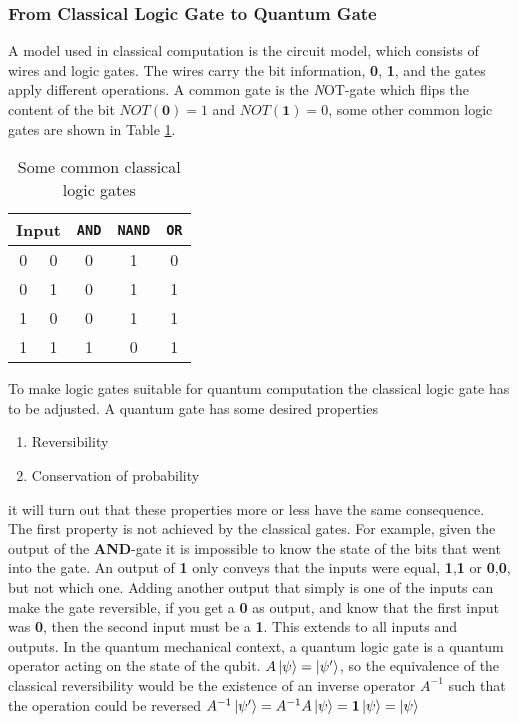 \subsubsection{From Classical Logic Gate to Quantum Gate}
A model used in classical computation is the circuit model, which consists of wires and logic gates. The wires carry the bit information, \textbf{0}, \textbf{1}, and the gates apply different operations. A common gate is the {\textit NOT}-gate which flips the content of the bit $NOT(\textbf{0}) = 1$ and $NOT(\textbf{1}) = 0$, some other common logic gates are shown in Table \ref{tab:gates}. 

\begin{table}[h]
    \centering
    \begin{tabular}{|c|c|c|c|c|}
    \hline
    \multicolumn{2}{|c|}{Input} & {\tt AND} & {\tt NAND} & {\tt OR}\\
    \hline
    0 & 0 & 0& 1& 0\\
    0 & 1 & 0& 1& 1\\
    1 & 0 & 0& 1& 1\\
    1 & 1 & 1& 0& 1\\
    \hline
    \end{tabular}
    \caption{Some common classical logic gates}
    \label{tab:gates}
\end{table}


To make logic gates suitable for quantum computation the classical logic gate has to be adjusted. A quantum gate has some desired properties
\begin{enumerate}
\item Reversibility 
\item Conservation of probability
\end{enumerate}
it will turn out that these properties more or less have the same consequence. The first property is not achieved by the classical gates. For example, given the output of the \textbf{AND}-gate it is impossible to know the state of the bits that went into the gate. An output of \textbf{1} only conveys that the inputs were equal, \textbf{1},\textbf{1} or \textbf{0},\textbf{0}, but not which one. Adding another output that simply is one of the inputs can make the gate reversible, if you get a \textbf{0} as output, and know that the first input was \textbf{0}, then the second input must be a \textbf{1}. This extends to all inputs and outputs. In the quantum mechanical context, a quantum logic gate is a quantum operator acting on the state of the qubit. $A\ket{\psi} = \ket{\psi'}$, so the equivalence of the classical reversibility would be the existence of an inverse operator $A^{-1}$ such that the operation could be reversed $A^{-1}\ket{\psi'} = A^{-1}A\ket{\psi} = \mathbf{1}\ket{\psi} = \ket{\psi}$

